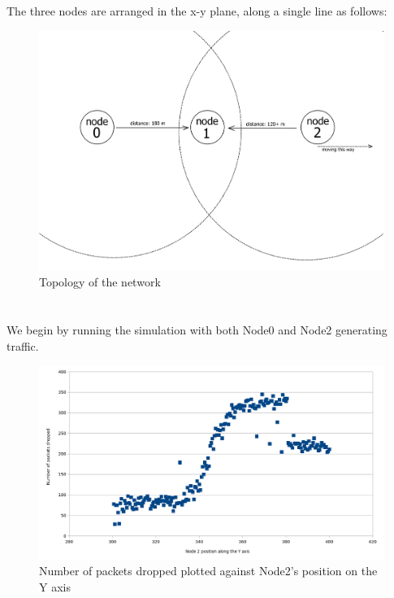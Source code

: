 \documentclass[11pt,journal]{article}
\begin{document}
	\section{}
	The three nodes are arranged in the x-y plane, along a single line as follows:
	\begin{figure}[h]
		\centering
		\includegraphics[scale=0.6]{lab3topology2.png}
		\caption{Topology of the network}
	\end{figure}

	\section{}
	We begin by running the simulation with both Node0 and Node2 generating traffic.
	\begin{figure}[h]
		\centering
		\includegraphics[scale=0.6]{graph1.png}
		\caption{Number of packets dropped plotted against Node2's position on the Y axis}
	\end{figure}
\end{document}
